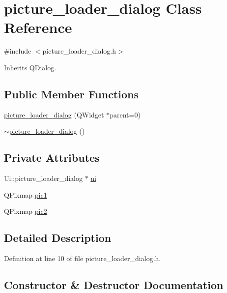 \hypertarget{classpicture__loader__dialog}{}\section{picture\+\_\+loader\+\_\+dialog Class Reference}
\label{classpicture__loader__dialog}


{\ttfamily \#include $<$picture\+\_\+loader\+\_\+dialog.\+h$>$}



Inherits Q\+Dialog.

\subsection*{Public Member Functions}
\begin{DoxyCompactItemize}
\item 
\hyperlink{classpicture__loader__dialog_a13af4fa7bc5bc01c8dbd40a9ad59de77}{picture\+\_\+loader\+\_\+dialog} (Q\+Widget $\ast$parent=0)
\item 
\hyperlink{classpicture__loader__dialog_a0d0f74bb2f6f60061b4216e8147fb227}{$\sim$picture\+\_\+loader\+\_\+dialog} ()
\end{DoxyCompactItemize}
\subsection*{Private Attributes}
\begin{DoxyCompactItemize}
\item 
Ui\+::picture\+\_\+loader\+\_\+dialog $\ast$ \hyperlink{classpicture__loader__dialog_ae91f4f9f193071a755fe6cf6ba5caa23}{ui}
\item 
Q\+Pixmap \hyperlink{classpicture__loader__dialog_a0b6814755183307c7639442c396ec625}{pic1}
\item 
Q\+Pixmap \hyperlink{classpicture__loader__dialog_a2e44ce23637092664a86ad018094c4f3}{pic2}
\end{DoxyCompactItemize}


\subsection{Detailed Description}


Definition at line 10 of file picture\+\_\+loader\+\_\+dialog.\+h.



\subsection{Constructor \& Destructor Documentation}
\mbox{\label{classpicture__loader__dialog_a13af4fa7bc5bc01c8dbd40a9ad59de77}} 
